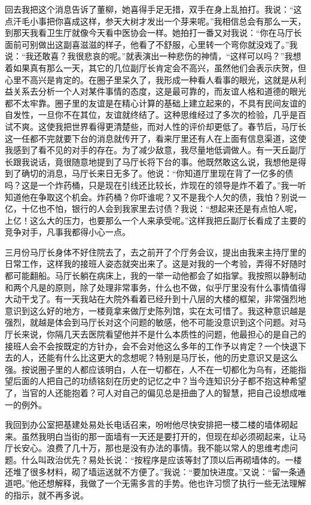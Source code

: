 \documentclass[12pt,oneside]{book}
\begin{document}
回去我把这个消息告诉了董柳，她喜得手足无措，双手在身上乱拍打。我说：``这点汗毛小事把你喜成这样，参天大树才发出一个芽来呢。''我相信总会有那么一天，到那天我看卫生厅就像今天看中医协会一样。她拍打一番又对我说：``你在马厅长面前可别做出这副喜滋滋的样子，他看了不舒服，心里转一个弯你就没戏了。''我说：``我还敢喜？我很悲哀的呢。''就表演出一种悲伤的神情，``这样可以吗？''我想着如果真有那么一天，其它的几位副厅长肯定会不高兴，虽然他们会表示庆贺，但心里不高兴是肯定的。在圈子里呆久了，我形成一种看人看事的眼光，这就是从利益关系去分析一个人对某件事情的态度，这是最可靠的，而友谊人格和道德的眼光都不太牢靠。圈子里的友谊是在精心计算的基础上建立起来的，不具有民间友谊的自发性，一旦你不在其位，友谊就终结了。这种思维经过了多次的检验，几乎是百试不爽。这使我把世界看得更清楚些，而对人性的评价却更低了。春节后，马厅长这一任都不完就要下台的消息就传开了，看来厅里还有人在上面有信息渠道，这使我感到了看不见的对手的存在。为了减少敌意，我尽量地低调做人。有一天丘副厅长跟我说话，竟很随意地提到了马厅长将下台的事。他既然敢这么说，我想他是得到了确切的消息，马厅长来日无多了。他说：``你知道厅里现在背了一亿多的债吗？这是一个炸药桶，只是现在引线还比较长，炸现在的领导是炸不着了。''我一听知道他在争取这个机会。炸药桶？你吓谁呢？又不是我个人欠的债，我怕？别说一亿，十亿也不怕，银行的人会到我家里去讨债？我说：``想起来还是有点怕人呢，上亿！这么大的压力，也要那么一个人来承受呢。''这样我把丘副厅长看成了主要的竞争对手，凡事我都得小心一点。

三月份马厅长身体不好住院去了，去之前开了个厅务会议，提出由我来主持厅里的日常工作，这样我的接班人姿态就突出来了。这是对我的一个考验，弄得不好随时都可能翻船。马厅长躺在病床上，我的一举一动他都会了如指掌。我按照以静制动和两个凡是的原则，除了处理非常事务，什么也不做，似乎厅里没有什么事情值得大动干戈了。有一天我站在大院外看着已经升到十八层的大楼的框架，非常强烈地意识到这么好的地方，一楼竟拿来做厅史陈列馆，实在太可惜了。我这种意识越是强烈，就越是体会到马厅长对这个问题的敏感，他不可能没意识到这个问题。对马厅长来说，你隔几天去医院看望他并不是什么本质性的问题，他最担心的是自己的接班人会不会按既定的方针办，会不会对他这么多年的工作予以肯定？一个快退下去的人，还能有什么比这更大的念想呢？特别是马厅长，他的历史意识又是这么强。按说圈子里的人都应该明白，人在一切都在，人不在一切都化为乌有，还能指望后面的人把自己的功绩铭刻在历史的记忆之中？当今连知识分子都不抱这种希望了，当官的人还能抱着？可人对自己的偏见总是扭曲了人的智慧，把自己设想成唯一的例外。

我回到办公室把基建处易处长电话召来，吩咐他尽快安排把一楼二楼的墙体砌起来。虽然我明白当街的那一面墙有一天还是要打开的，但现在却必须砌起来，让马厅长安心。浪费了几十万，那也是没有办法的事情。我不能以常人的思维考虑问题。什么叫政治优先？易处长说：``按程序是应该等封了顶以后再砌墙体的。一楼还堆了很多材料，砌了墙运送就不方便了。''我说：``要加快进度。''又说：``留一条通道吧。''他还想解释，我做了一个无需多言的手势。他也许习惯了执行一些无法理解的指示，就不再多说。
\end{document}
